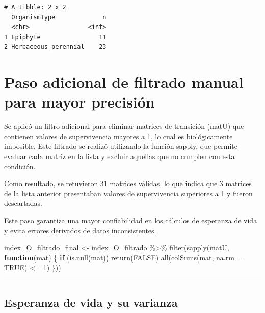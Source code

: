 \documentclass[
  12pt,
  letterpaper,
]{book}
\newenvironment{Shaded}{\begin{snugshade}}{\end{snugshade}}
\newcommand{\AttributeTok}[1]{\textcolor[rgb]{0.40,0.45,0.13}{#1}}
\newcommand{\ConstantTok}[1]{\textcolor[rgb]{0.56,0.35,0.01}{#1}}
\newcommand{\ControlFlowTok}[1]{\textcolor[rgb]{0.00,0.23,0.31}{\textbf{#1}}}
\newcommand{\DecValTok}[1]{\textcolor[rgb]{0.68,0.00,0.00}{#1}}
\newcommand{\FunctionTok}[1]{\textcolor[rgb]{0.28,0.35,0.67}{#1}}
\newcommand{\NormalTok}[1]{\textcolor[rgb]{0.00,0.23,0.31}{#1}}
\newcommand{\OtherTok}[1]{\textcolor[rgb]{0.00,0.23,0.31}{#1}}
\newcommand{\SpecialCharTok}[1]{\textcolor[rgb]{0.37,0.37,0.37}{#1}}
\begin{document}
\begin{verbatim}
# A tibble: 2 x 2
  OrganismType             n
  <chr>                <int>
1 Epiphyte                11
2 Herbaceous perennial    23
\end{verbatim}

\chapter{Paso adicional de filtrado manual para mayor
precisión}\label{paso-adicional-de-filtrado-manual-para-mayor-precisiuxf3n}

Se aplicó un filtro adicional para eliminar matrices de transición
(matU) que contienen valores de supervivencia mayores a 1, lo cual es
biológicamente imposible. Este filtrado se realizó utilizando la función
sapply, que permite evaluar cada matriz en la lista y excluir aquellas
que no cumplen con esta condición.

Como resultado, se retuvieron 31 matrices válidas, lo que indica que 3
matrices de la lista anterior presentaban valores de supervivencia
superiores a 1 y fueron descartadas.

Este paso garantiza una mayor confiabilidad en los cálculos de esperanza
de vida y evita errores derivados de datos inconsistentes.

\begin{Shaded}
\begin{Highlighting}[]
\NormalTok{index\_O\_filtrado\_final }\OtherTok{\textless{}{-}}\NormalTok{ index\_O\_filtrado }\SpecialCharTok{\%\textgreater{}\%}
  \FunctionTok{filter}\NormalTok{(}\FunctionTok{sapply}\NormalTok{(matU, }\ControlFlowTok{function}\NormalTok{(mat) \{}
    \ControlFlowTok{if}\NormalTok{ (}\FunctionTok{is.null}\NormalTok{(mat)) }\FunctionTok{return}\NormalTok{(}\ConstantTok{FALSE}\NormalTok{)}
    \FunctionTok{all}\NormalTok{(}\FunctionTok{colSums}\NormalTok{(mat, }\AttributeTok{na.rm =} \ConstantTok{TRUE}\NormalTok{) }\SpecialCharTok{\textless{}=} \DecValTok{1}\NormalTok{)}
\NormalTok{  \}))}
\end{Highlighting}
\end{Shaded}

\begin{center}\rule{0.5\linewidth}{0.5pt}\end{center}

\section{Esperanza de vida y su
varianza}\label{esperanza-de-vida-y-su-varianza}
\end{document}
